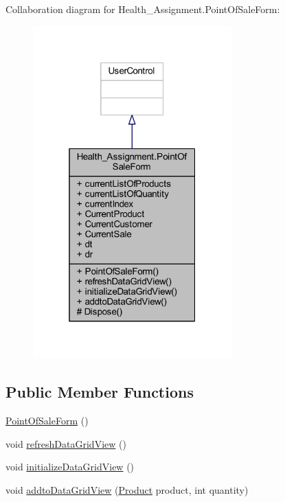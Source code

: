 Collaboration diagram for Health\+\_\+\+Assignment.\+Point\+Of\+Sale\+Form\+:\nopagebreak
\begin{figure}[H]
\begin{center}
\leavevmode
\includegraphics[width=217pt]{class_health___assignment_1_1_point_of_sale_form__coll__graph}
\end{center}
\end{figure}
\subsection*{Public Member Functions}
\begin{DoxyCompactItemize}
\item 
\hyperlink{class_health___assignment_1_1_point_of_sale_form_af4f5567d73c86b60e8c3257c591ac1cb}{Point\+Of\+Sale\+Form} ()
\item 
void \hyperlink{class_health___assignment_1_1_point_of_sale_form_ac6c8662aeb26716567b41498bfe585a7}{refresh\+Data\+Grid\+View} ()
\item 
void \hyperlink{class_health___assignment_1_1_point_of_sale_form_a2920adbbd19eb155325723739e3bfda4}{initialize\+Data\+Grid\+View} ()
\item 
void \hyperlink{class_health___assignment_1_1_point_of_sale_form_acdc7fb768eed966502c5dbc32f75b3c0}{addto\+Data\+Grid\+View} (\hyperlink{class_health___assignment_1_1_product}{Product} product, int quantity)
\end{DoxyCompactItemize}
